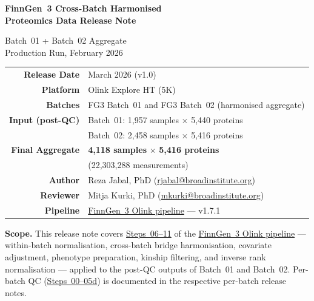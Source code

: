 \documentclass[11pt,a4paper]{article}
\newcommand{\pipelinelink}{%
  \href{https://github.com/FINNGEN/FinnGen3-proteomics-pipeline}%
       {FinnGen~3 Olink pipeline}}
\begin{document}
\thispagestyle{plain}

\begin{center}

\vspace*{2cm}

{\LARGE\bfseries FinnGen~3 Cross-Batch Harmonised\\[0.3em]
Proteomics Data Release Note}

\vspace{0.6cm}

{\large Batch~01 + Batch~02 Aggregate\\[0.2em]
Production Run, February 2026}

\vspace{1.8cm}

\begin{tabular}{@{} r @{\quad} l @{}}
\textbf{Release Date}       & March 2026 (v1.0) \\[4pt]
\textbf{Platform}           & Olink Explore HT (5K) \\[4pt]
\textbf{Batches}            & FG3 Batch~01 and FG3 Batch~02 (harmonised aggregate) \\[4pt]
\textbf{Input (post-QC)}    & Batch~01: 1,957 samples $\times$ 5,440 proteins \\
                             & Batch~02: 2,458 samples $\times$ 5,416 proteins \\[4pt]
\textbf{Final Aggregate}    & \textbf{4,118 samples} $\times$ \textbf{5,416 proteins} \\
                             & (22,303,288 measurements) \\[4pt]
\textbf{Author}             & Reza Jabal, PhD
                               (\href{mailto:rjabal@broadinstitute.org}{rjabal@broadinstitute.org}) \\[4pt]
\textbf{Reviewer}           & Mitja Kurki, PhD
                               (\href{mailto:mkurki@broadinstitute.org}{mkurki@broadinstitute.org}) \\[4pt]
\textbf{Pipeline}           & \pipelinelink{} --- v1.7.1 \\
\end{tabular}

\vspace{1.5cm}

\begin{tcolorbox}[colback=gray!5,colframe=gray!60,boxrule=0.5pt,
                  width=0.92\textwidth]
\textbf{Scope.}\enspace
This release note covers \href{https://github.com/FINNGEN/FinnGen3-proteomics-pipeline#pipeline-steps}{Steps~06--11} of the \pipelinelink{} ---
within-batch normalisation, cross-batch bridge harmonisation, covariate
adjustment, phenotype preparation, kinship filtering, and inverse rank
normalisation --- applied to the post-QC outputs of Batch~01 and Batch~02.
Per-batch QC (\href{https://github.com/FINNGEN/FinnGen3-proteomics-pipeline#pipeline-steps}{Steps~00--05d}) is documented in the respective per-batch
release notes.
\end{tcolorbox}

\end{center}
\end{document}
